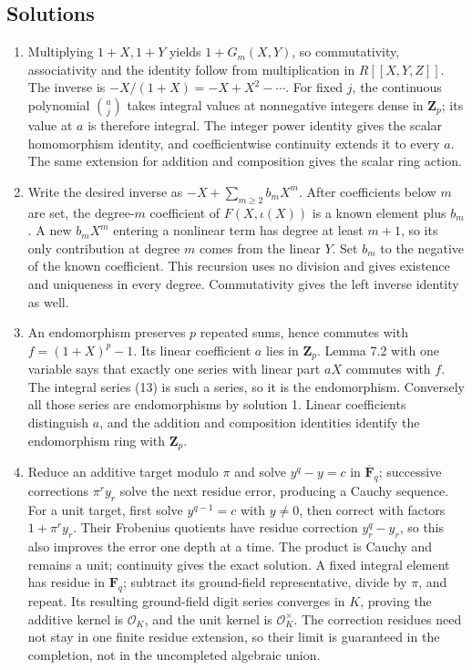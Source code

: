 \documentclass[11pt,a4paper]{article}
\newcommand{\tightlist}{\setlength{\itemsep}{0pt}\setlength{\parskip}{0pt}}
\begin{document}
\subsection{Solutions}\label{solutions}

\begin{enumerate}
\def\labelenumi{\arabic{enumi}.}
\tightlist
\item
  Multiplying \(1+X,1+Y\) yields \(1+G_m(X,Y)\), so commutativity,
  associativity and the identity follow from multiplication in
  \(R[[X,Y,Z]]\). The inverse is \(-X/(1+X)=-X+X^2-\cdots\). For fixed
  \(j\), the continuous polynomial \(\binom aj\) takes integral values
  at nonnegative integers dense in \(\mathbf Z_p\); its value at \(a\)
  is therefore integral. The integer power identity gives the scalar
  homomorphism identity, and coefficientwise continuity extends it to
  every \(a\). The same extension for addition and composition gives the
  scalar ring action.
\item
  Write the desired inverse as \(-X+\sum_{m\geq2}b_mX^m\). After
  coefficients below \(m\) are set, the degree-\(m\) coefficient of
  \(F(X,\iota(X))\) is a known element plus \(b_m\). A new \(b_mX^m\)
  entering a nonlinear term has degree at least \(m+1\), so its only
  contribution at degree \(m\) comes from the linear \(Y\). Set \(b_m\)
  to the negative of the known coefficient. This recursion uses no
  division and gives existence and uniqueness in every degree.
  Commutativity gives the left inverse identity as well.
\item
  An endomorphism preserves \(p\) repeated sums, hence commutes with
  \(f=(1+X)^p-1\). Its linear coefficient \(a\) lies in \(\mathbf Z_p\).
  Lemma 7.2 with one variable says that exactly one series with linear
  part \(aX\) commutes with \(f\). The integral series (13) is such a
  series, so it is the endomorphism. Conversely all those series are
  endomorphisms by solution 1. Linear coefficients distinguish \(a\),
  and the addition and composition identities identify the endomorphism
  ring with \(\mathbf Z_p\).
\item
  Reduce an additive target modulo \(\pi\) and solve \(y^q-y=c\) in
  \(\overline{\mathbf F}_q\); successive corrections \(\pi^r y_r\) solve
  the next residue error, producing a Cauchy sequence. For a unit
  target, first solve \(y^{q-1}=c\) with \(y\ne0\), then correct with
  factors \(1+\pi^r y_r\). Their Frobenius quotients have residue
  correction \(y_r^q-y_r\), so this also improves the error one depth at
  a time. The product is Cauchy and remains a unit; continuity gives the
  exact solution. A fixed integral element has residue in
  \(\mathbf F_q\); subtract its ground-field representative, divide by
  \(\pi\), and repeat. Its resulting ground-field digit series converges
  in \(K\), proving the additive kernel is \(\mathcal O_K\), and the
  unit kernel is \(\mathcal O_K^\times\). The correction residues need
  not stay in one finite residue extension, so their limit is guaranteed
  in the completion, not in the uncompleted algebraic union.
\end{enumerate}
\end{document}
